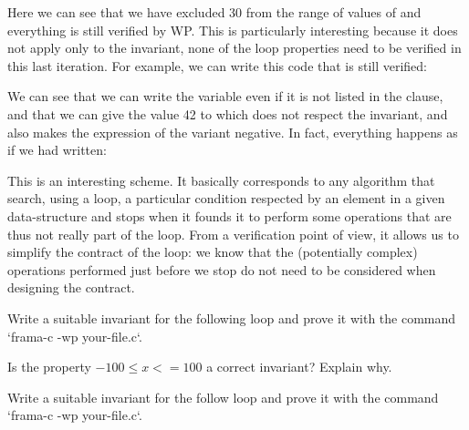 


Here we can see that we have excluded 30 from the range of values of
 and everything is still verified by WP. This is particularly
interesting because it does not apply only to the invariant, none of the loop
properties need to be verified in this last iteration. For example, we can
write this code that is still verified:






We can see that we can write the variable  even if it is not
listed in the  clause, and that we can give the
value 42 to  which does not respect the invariant, and also
makes the expression of the variant negative. In fact, everything happens
as if we had written:






This is an interesting scheme. It basically corresponds to any algorithm
that search, using a loop, a particular condition respected by an element
in a given data-structure and stops when it founds it to perform some
operations that are thus not really part of the loop. From a verification
point of view, it allows us to simplify the contract of the loop: we know
that the (potentially complex) operations performed just before we stop do
not need to be considered when designing the contract.







Write a suitable invariant for the following loop and prove it with
the command `frama-c -wp your-file.c`.




Is the property $-100 \leq x <= 100$ a correct invariant? Explain why.





Write a suitable invariant for the follow loop and prove it with
the command `frama-c -wp your-file.c`.




